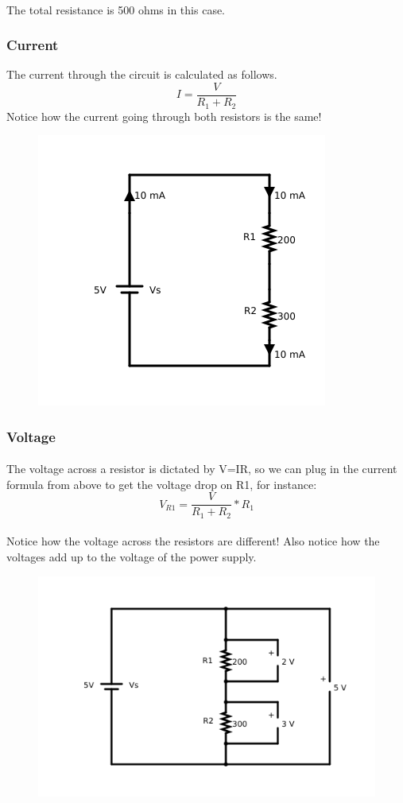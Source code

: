 \documentclass{article}
\begin{document}
\paragraph{}
The total resistance is 500 ohms in this case.

\subsubsection{Current}
The current through the circuit is calculated as follows.
\begin{equation*}
  I = \frac{V}{R_1+R_2}
\end{equation*}
 Notice how the current going through both resistors is the same!
\begin{figure}[H]
  \centering
  \includegraphics[width=0.4\linewidth]{pngs/07-resistors-series-current.png}
\end{figure}

\subsubsection{Voltage}
\paragraph{}
The voltage across a resistor is dictated by V=IR, so we can plug in the current formula from above to get the voltage drop on R1, for instance:
\begin{equation*}
  V_{R1} = \frac{V}{R_1+R_2}*R_1
\end{equation*}
\paragraph{}
Notice how the voltage across the resistors are different! Also notice how the voltages add up to the voltage of the power supply.
\begin{figure}[H]
  \centering
  \includegraphics[width=0.6\linewidth]{pngs/07-resistors-series-voltage.png}
\end{figure}
\end{document}
